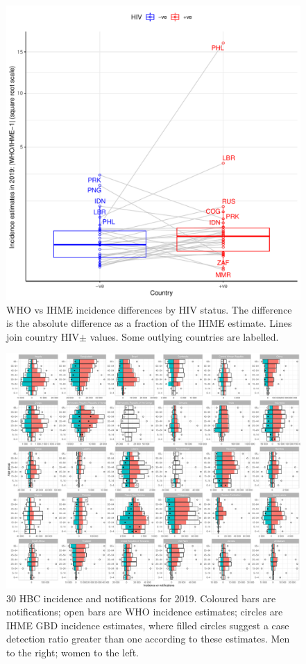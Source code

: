 \documentclass[12pt]{article}
\begin{document}
\begin{figure}
  \centering
  \includegraphics[width=1\textwidth]{../plots/aF9.pdf}
  \caption[WHO vs IHME incidence differences by HIV status]{WHO vs IHME
    incidence differences by HIV status. The difference is the absolute
    difference as a fraction of the IHME estimate. Lines join country HIV$\pm$
    values. Some outlying countries are labelled.}
\end{figure}

\FloatBarrier


\begin{figure}
\centering
\includegraphics[width=1\textwidth]{../plots/aF1.pdf}
\caption[30 HBC incidence and notifications]{30 HBC incidence and notifications
  for 2019.
  Coloured bars are notifications; open bars are WHO incidence estimates; circles are IHME GBD incidence estimates, where filled circles suggest a case detection ratio greater than one according to these estimates. Men to the right; women to the left.}
\end{figure}
\end{document}
